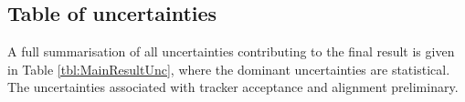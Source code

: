 \begin{landscape}

\subsection{Table of uncertainties}

\thispagestyle{empty}

A full summarisation of all uncertainties contributing to the final result is given in Table \ref{tbl:MainResultUnc}, where the dominant uncertainties are statistical. The uncertainties associated with tracker acceptance and alignment preliminary. %


\end{landscape}
